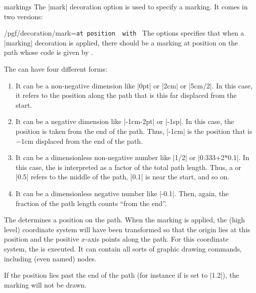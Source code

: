 \begin{decoration}{markings}
    The |mark| decoration option is used to specify a marking. It comes in two
    versions:
    \begin{key}{/pgf/decoration/mark=\texttt{at position }\texttt{ with }}
        The options specifies that when a |marking| decoration is applied,
        there should be a marking at position  on the path whose code
        is given by .

        The  can have four different forms:
        \begin{enumerate}
            \item It can be a non-negative dimension like |0pt| or |2cm| or
                |5cm/2|. In this case, it refers to the position along the path
                that is this far displaced from the start.
            \item It can be a negative dimension like |-1cm-2pt| or |-1sp|. In
                this case, the position is taken from the end of the path.
                Thus, |-1cm| is the position that is $-1$cm displaced from the
                end of the path.
            \item It can be a dimensionless non-negative number like |1/2| or
                |0.333+2*0.1|. In this case, the  is interpreted as a
                factor of the total path length. Thus, a  or |0.5|
                refers to the middle of the path, |0.1| is near the start, and
                so on.
            \item It can be a dimensionless negative number like |-0.1|. Then,
                again, the fraction of the path length counts ``from the end''.
        \end{enumerate}

        The  determines a position on the path. When the marking is
        applied, the (high level) coordinate system will have been transformed
        so that the origin lies at this position and the positive $x$-axis
        points along the path. For this coordinate system, the  is
        executed. It can contain all sorts of graphic drawing commands,
        including (even named) nodes.

        If the position lies past the end of the path (for instance if
         is set to |1.2|), the marking will not be drawn.


\end{key}
\end{decoration}
